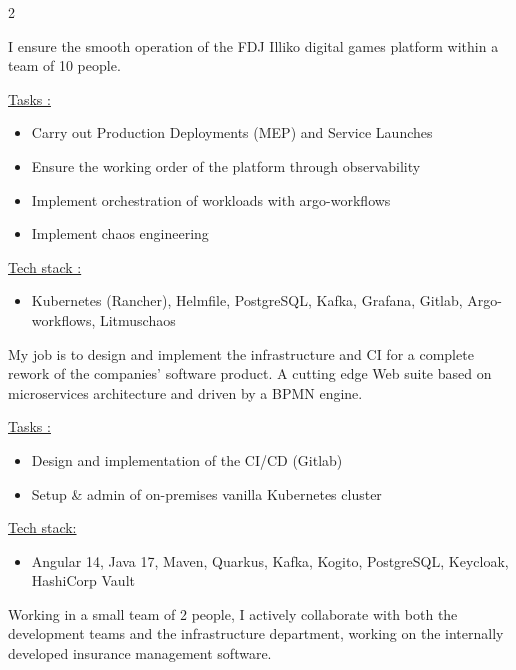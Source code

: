 \documentclass[10pt,a4paper,withhyper]{altacv}
\begin{document}
\begin{paracol}{2}

I ensure the smooth operation of the FDJ Illiko digital games platform within a
team of 10 people.

\underline{Tasks :}
\begin{itemize}
\item Carry out Production Deployments (MEP) and Service Launches
\item Ensure the working order of the platform through observability
\item Implement orchestration of workloads with argo-workflows
\item Implement chaos engineering
\end{itemize}

\underline{Tech stack :}
\begin{itemize}
\item Kubernetes (Rancher), Helmfile, PostgreSQL, Kafka, Grafana, Gitlab, Argo-workflows, Litmuschaos
\end{itemize}

\divider

My job is to design and implement the infrastructure and CI for a complete rework of the companies' software product.
A cutting edge Web suite based on microservices architecture and driven by a BPMN engine.

\underline{Tasks :}
\begin{itemize}
\item Design and implementation of the CI/CD (Gitlab)
\item Setup \& admin of on-premises vanilla Kubernetes cluster
\end{itemize}
\underline{Tech stack:}
\begin{itemize}
\item Angular 14, Java 17, Maven, Quarkus, Kafka, Kogito, PostgreSQL, Keycloak, HashiCorp Vault
\end{itemize}

\divider

Working in a small team of 2 people, I actively collaborate with both the development teams and the infrastructure department, working on the internally developed insurance management software.


\end{paracol}
\end{document}
